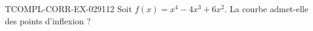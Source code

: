 \begin{exercice}{TCOMPL-CORR-EX-029}{1}{12}
Soit $f(x) = x^4 - 4x^3 + 6x^2$. La courbe admet-elle des points d'inflexion ?

\end{exercice}
